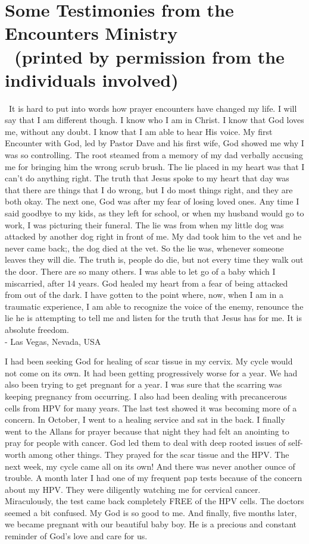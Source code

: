 \documentclass[oneside]{book}
\begin{document}
\chapter*{Some Testimonies from the Encounters Ministry\\
	\
	\small{(printed by permission from the individuals involved)}
}
\clearpage
\
It is hard to put into words how prayer encounters have changed my life. I will say that I am different though.  I know who I am in Christ. I know that God loves me, without any doubt.  I know that I am able to hear His voice.
My first Encounter with God, led by Pastor Dave and his first wife, God showed me why I was so controlling. The root steamed from a memory of my dad verbally accusing me for bringing him the wrong scrub brush. The lie placed in my heart was that I can't do anything right. The truth that Jesus spoke to my heart that day was that there are things that I do wrong, but I do most things right, and they are both okay.
The next one, God was after my fear of losing loved ones. Any time I said goodbye to my kids, as they left for school, or when my husband would go to work, I was picturing their funeral. The lie was from when my little dog was attacked by another dog right in front of me. My dad took him to the vet and he never came back;, the dog died at the vet. So the lie was, whenever someone leaves they will die. The truth is,  people do die, but not every time they walk out the door.
There are so many others.  I was able to let go of a baby which I miscarried, after 14 years.
God healed my heart from a fear of being attacked from out of the dark.
I have gotten to the point where, now, when I am in a traumatic experience,  I am able to recognize the voice of the enemy, renounce the lie he is attempting to tell me and listen for the truth that Jesus has for me. It is absolute  freedom. \\

- Las Vegas, Nevada, USA
\clearpage

I had been seeking God for healing of scar tissue in my cervix. My cycle would not come on its own. It had been getting progressively worse for a year. We had also been trying to get pregnant for a year. I was sure that the scarring was keeping pregnancy from occurring. I also had been dealing with precancerous cells from HPV for many years. The last test showed it was becoming more of a concern.
In October, I went to a healing service and sat in the back. I finally went to the Allans for prayer because that night they had felt an anointing to pray for people with cancer. God led them to deal with deep rooted issues of self-worth among other things. They prayed for the scar tissue and the HPV.
The next week, my cycle came all on its own! And there was never another ounce of trouble. A month later I had one of my frequent pap tests because of the concern about my HPV. They were diligently watching me for cervical cancer. Miraculously, the test came back  completely FREE of the HPV cells. The doctors seemed a bit confused. My God is so good to me.
And finally, five months later, we became pregnant with our beautiful baby boy. He is a precious and constant reminder of God's love and care for us. \\
\end{document}

